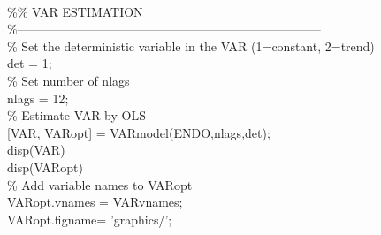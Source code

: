 \hspace{1mm}\hspace{5mm}  \\ 
\hspace{1mm}\hspace{5mm} \textcolor{matlabgreen}{\%}\textcolor{matlabgreen}{\% VAR ESTIMATION }\\ 
\hspace{1mm}\hspace{5mm} \textcolor{matlabgreen}{\%--------------------------------------------------------------------------  }\\ 
\hspace{1mm}\hspace{5mm} \textcolor{matlabgreen}{\% Set the deterministic variable in the VAR (1=constant, 2=trend) }\\ 
\hspace{1mm}\hspace{5mm} det = 1; \\ 
\hspace{1mm}\hspace{5mm} \textcolor{matlabgreen}{\% Set number of nlags }\\ 
\hspace{1mm}\hspace{5mm} nlags = 12; \\ 
\hspace{1mm}\hspace{5mm} \textcolor{matlabgreen}{\% Estimate VAR by OLS }\\ 
\hspace{1mm}\hspace{5mm} [VAR, VARopt] = VARmodel(ENDO,nlags,det); \\ 
\hspace{1mm}\hspace{5mm} disp(VAR) \\ 
\hspace{1mm}\hspace{5mm} disp(VARopt) \\ 
\hspace{1mm}\hspace{5mm} \textcolor{matlabgreen}{\% Add variable names to VARopt }\\ 
\hspace{1mm}\hspace{5mm} VARopt.vnames = VARvnames; \\ 
\hspace{1mm}\hspace{5mm} VARopt.figname= \textcolor{matlabpurple}{'graphics/'}; \\ 
